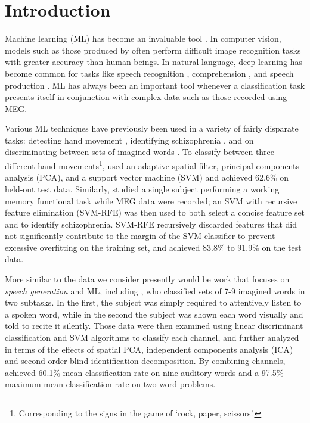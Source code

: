 \documentclass[utf8]{frontiersSCNS} %
\begin{document}
\section{Introduction}


Machine learning (ML) has become an invaluable tool \cite{LeCun2015}. In computer vision, models such as those produced by \cite{He2015a} often perform difficult image recognition tasks with greater accuracy than human beings. In natural language, deep learning has become common for tasks like speech recognition \cite{Bahdanau}, comprehension \cite{Moritz}, and speech production \cite{VanDenOord}. ML has always been an important tool whenever a classification task presents itself in conjunction with complex data such as those recorded using MEG.

Various ML techniques have previously been used in a variety of fairly disparate tasks: detecting hand movement \cite{Asano2009}, identifying schizophrenia \cite{Ince2008}, and on discriminating between sets of imagined words \cite{Guimaraes2007}. To classify between three different hand movements\footnote{Corresponding to the signs in the game of `rock, paper, scissors'.}, \cite{Asano2009} used an adaptive spatial filter, principal components analysis (PCA), and a support vector machine (SVM) and achieved 62.6\% on held-out test data. Similarly, \cite{Ince2008} studied a single subject performing a working memory functional task while MEG data were recorded; an SVM with recursive feature elimination (SVM-RFE) was then used to both select a concise feature set and to identify schizophrenia. SVM-RFE recursively discarded features that did not significantly contribute to the margin of the SVM classifier to prevent excessive overfitting on the training set, and achieved 83.8\% to 91.9\% on the test data.

More similar to the data we consider presently would be work that focuses on \emph{speech generation} and ML, including \cite{Guimaraes2007}, who classified sets of 7-9 imagined words in two subtasks. In the first, the subject was simply required to attentively listen to a spoken word, while in the second the subject was shown each word visually and told to recite it silently. Those data were then examined using linear discriminant classification and SVM algorithms to classify each channel, and further analyzed in terms of the effects of spatial PCA, independent components analysis (ICA) and second-order blind identification decomposition. By combining channels, \cite{Guimaraes2007} achieved 60.1\% mean classification rate on nine auditory words and a 97.5\% maximum mean classification rate on two-word problems.
\end{document}
